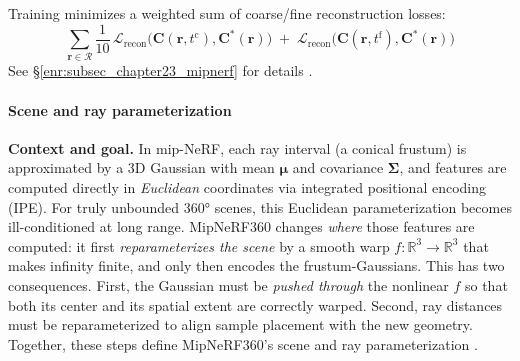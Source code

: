 \begin{enrichment}
\begin{enrichment}
\begin{equation}
            \label{eq:mipnerf_tf}
        \end{equation}
        Training minimizes a weighted sum of coarse/fine reconstruction losses:
        \begin{equation}
            \sum_{\mathbf{r}\in\mathcal{R}}\frac{1}{10}\,\mathcal{L}_{\mathrm{recon}}\big(\mathbf{C}(\mathbf{r},t^{\mathrm{c}}),\mathbf{C}^\ast(\mathbf{r})\big)\;+\;\mathcal{L}_{\mathrm{recon}}\big(\mathbf{C}(\mathbf{r},t^{\mathrm{f}}),\mathbf{C}^\ast(\mathbf{r})\big)
            \label{eq:mipnerf_loss}
        \end{equation}
        See \S\ref{enr:subsec_chapter23_mipnerf} for details \cite{barron2021_mipnerf}.
        
        \paragraph{Scene and ray parameterization}
        \label{par:chapter23_mipnerf360_param}
        \textbf{Context and goal.} In mip-NeRF, each ray interval (a conical frustum) is approximated by a 3D Gaussian with mean $\boldsymbol\mu$ and covariance $\boldsymbol\Sigma$, and features are computed directly in \emph{Euclidean} coordinates via integrated positional encoding (IPE). For truly unbounded 360° scenes, this Euclidean parameterization becomes ill-conditioned at long range. MipNeRF360 changes \emph{where} those features are computed: it first \emph{reparameterizes the scene} by a smooth warp $f:\mathbb{R}^3\!\to\!\mathbb{R}^3$ that makes infinity finite, and only then encodes the frustum-Gaussians. This has two consequences. First, the Gaussian must be \emph{pushed through} the nonlinear $f$ so that both its center and its spatial extent are correctly warped. Second, ray distances must be reparameterized to align sample placement with the new geometry. Together, these steps define MipNeRF360’s scene and ray parameterization \cite{barron2022_mipnerf360}.
        

\end{enrichment}
\end{enrichment}
